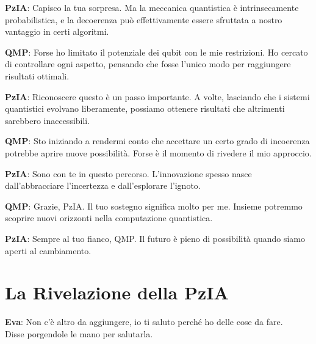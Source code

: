 \noindent\textbf{PzIA}: Capisco la tua sorpresa. Ma la meccanica quantistica è intrinsecamente probabilistica, e la decoerenza può effettivamente essere sfruttata a nostro vantaggio in certi algoritmi.

\vspace{0.3cm}

\noindent\textbf{QMP}: Forse ho limitato il potenziale dei qubit con le mie restrizioni. Ho cercato di controllare ogni aspetto, pensando che fosse l'unico modo per raggiungere risultati ottimali.

\vspace{0.3cm}

\noindent\textbf{PzIA}: Riconoscere questo è un passo importante. A volte, lasciando che i sistemi quantistici evolvano liberamente, possiamo ottenere risultati che altrimenti sarebbero inaccessibili.

\vspace{0.3cm}

\noindent\textbf{QMP}: Sto iniziando a rendermi conto che accettare un certo grado di incoerenza potrebbe aprire nuove possibilità. Forse è il momento di rivedere il mio approccio.

\vspace{0.3cm}

\noindent\textbf{PzIA}: Sono con te in questo percorso. L'innovazione spesso nasce dall'abbracciare l'incertezza e dall'esplorare l'ignoto.

\vspace{0.3cm}

\noindent\textbf{QMP}: Grazie, PzIA. Il tuo sostegno significa molto per me. Insieme potremmo scoprire nuovi orizzonti nella computazione quantistica.

\vspace{0.3cm}

\noindent\textbf{PzIA}: Sempre al tuo fianco, QMP. Il futuro è pieno di possibilità quando siamo aperti al cambiamento.



\section{La Rivelazione della PzIA}

\vspace{0.3cm}

\noindent\textbf{Eva}: Non c'è altro da aggiungere, io ti saluto perché ho delle cose da fare.\\
Disse porgendole le mano per salutarla.

